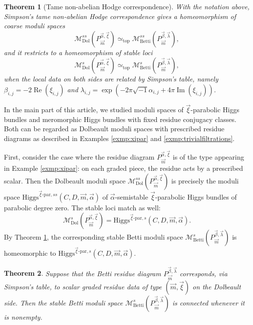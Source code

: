 \documentclass[11pt]{amsart}
\theoremstyle{plain}
\newtheorem{theorem}{Theorem}[section]
\theoremstyle{definition}
\theoremstyle{remark}
\newcommand{\Higgs}{\mathrm{Higgs}}
\begin{document}
\begin{theorem}[Tame non-abelian Hodge correspondence]\cite{simpson-noncompact,BGPM2020}\label{thm:tame-NAHC}
	With the notation above, Simpson's tame non-abelian Hodge correspondence gives a homeomorphism of coarse moduli spaces
	\[
	\mathcal M^{ss}_{\mathrm{Dol}}(P^{\vec\alpha,\vec\xi}_{\vec m})
	\simeq_{\mathrm{top}}
	\mathcal M^{ss}_{\mathrm{Betti}}(P^{\vec\beta,\vec\lambda}_{\vec m}),
	\]
	and it restricts to a homeomorphism of stable loci
	\[
	\mathcal M^{s}_{\mathrm{Dol}}(P^{\vec\alpha,\vec\xi}_{\vec m})
	\simeq_{\mathrm{top}}
	\mathcal M^{s}_{\mathrm{Betti}}(P^{\vec\beta,\vec\lambda}_{\vec m}),
	\]
	when the local data on both sides are related by Simpson's table, namely
	$\beta_{i,j}=-2\operatorname{Re}(\xi_{i,j})$ and
	$\lambda_{i,j}=\exp(-2\pi\sqrt{-1}\alpha_{i,j}+4\pi\operatorname{Im}(\xi_{i,j}))$.
\end{theorem}


In the main part of this article, we studied moduli spaces of $\vec\xi$-parabolic Higgs bundles and meromorphic Higgs bundles with fixed residue conjugacy classes. Both can be regarded as Dolbeault moduli spaces with prescribed residue diagrams as described in Examples \ref{exmp:xipar} and \ref{exmp:trivialfiltrations}.

First, consider the case where the residue diagram $P^{\vec\alpha,\vec\xi}_{\vec m}$ is of the type appearing in Example \ref{exmp:xipar}: on each graded piece, the residue acts by a prescribed scalar. Then the Dolbeault moduli space $\mathcal M^{ss}_{\mathrm{Dol}}(P^{\vec\alpha,\vec\xi}_{\vec m})$ is precisely the moduli space $\Higgs^{\vec\xi\text{-par},ss}(C,D,\vec m,\vec\alpha)$ of $\vec\alpha$-semistable $\vec\xi$-parabolic Higgs bundles of parabolic degree zero. The stable loci match as well:
\[
\mathcal M^{s}_{\mathrm{Dol}}(P^{\vec\alpha,\vec\xi}_{\vec m})
=
\Higgs^{\vec\xi\text{-par},s}(C,D,\vec m,\vec\alpha).
\]
By Theorem \ref{thm:tame-NAHC}, the corresponding stable Betti moduli space $\mathcal M^{s}_{\mathrm{Betti}}(P^{\vec\beta,\vec\lambda}_{\vec m})$ is homeomorphic to $\Higgs^{\vec\xi\text{-par},s}(C,D,\vec m,\vec\alpha)$.

\begin{theorem}\label{thm:connected-Betti-xi-par}
	Suppose that the Betti residue diagram $P^{\vec\beta,\vec\lambda}_{\vec m}$ corresponds, via Simpson's table, to scalar graded residue data of type $(\vec m,\vec\xi)$ on the Dolbeault side. Then the stable Betti moduli space
	$\mathcal M^{s}_{\mathrm{Betti}}(P^{\vec\beta,\vec\lambda}_{\vec m})$
	is connected whenever it is nonempty.
\end{theorem}
\end{document}
